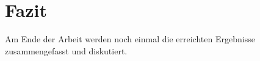\section{Fazit}

Am Ende der Arbeit werden noch einmal die erreichten Ergebnisse
zusammengefasst und diskutiert.
